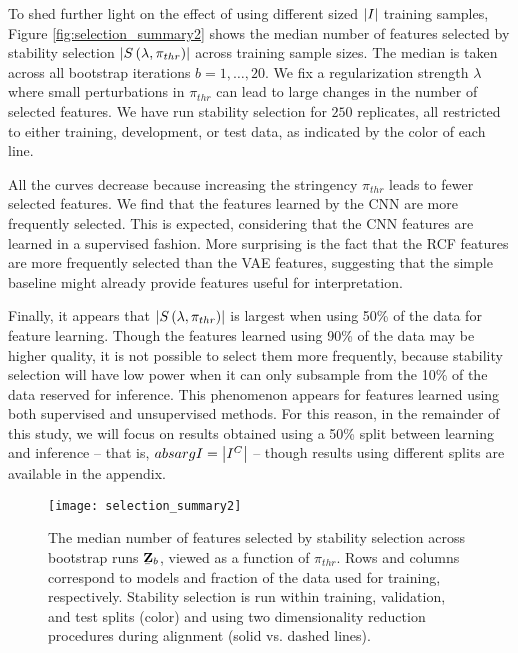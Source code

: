 To shed further light on the effect of using different sized $\left|I\right|$
training samples, Figure \ref{fig:selection_summary2} shows the median number of
features selected by stability selection $\left|S\left(\lambda,
  \pi_{thr}\right)\right|$ across training sample sizes. The median is taken across
all bootstrap iterations $b = 1, \dots, 20$. We fix a regularization strength
$\lambda$ where small perturbations in $\pi_{thr}$ can lead to large changes in
the number of selected features. We have run stability selection for $250$
replicates, all restricted to either training, development, or test data, as
indicated by the color of each line.

All the curves decrease because increasing the stringency $\pi_{thr}$ leads to
fewer selected features. We find that the features learned by the CNN are more
frequently selected. This is expected, considering that the CNN features are
learned in a supervised fashion. More surprising is the fact that the RCF
features are more frequently selected than the VAE features, suggesting that the
simple baseline might already provide features useful for interpretation.

Finally, it appears that $\left|S\left(\lambda, \pi_{thr}\right)\right|$ is largest
when using 50\% of the data for feature learning. Though the features learned
using 90\% of the data may be higher quality, it is not possible to select them
more frequently, because stability selection will have low power when it can
only subsample from the 10\% of the data reserved for inference. This phenomenon
appears for features learned using both supervised and unsupervised methods. For
this reason, in the remainder of this study, we will focus on results obtained
using a 50\% split between learning and inference -- that is, $absarg{I} =
\left|I^{C}\right|$ -- though results using different splits are available in the
appendix.

\begin{figure}
  \centering
  \texttt{[image: selection\_summary2]}
  \caption{The median number of features selected by stability selection across
    bootstrap runs $\protect\underaccent{\bar}{\mathbf{Z}}_{b}$, viewed as a function of
    $\pi_{thr}$. Rows and columns correspond to models and fraction of the data
    used for training, respectively. Stability selection is run within training,
    validation, and test splits (color) and using two dimensionality reduction
    procedures during alignment (solid vs. dashed lines).}
  \label{fig:selection_summary}
\end{figure}

